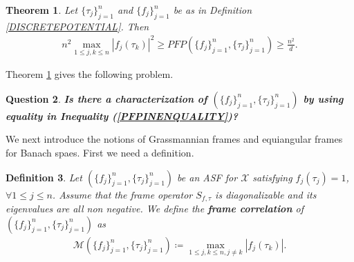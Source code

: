 \documentclass{amsart}
\newtheorem{theorem}{Theorem}[section]
\newtheorem{definition}[theorem]{Definition}
\newtheorem{question}[theorem]{Question}
\begin{document}
\begin{theorem}\label{PFPTHEOREM}
	Let $\{\tau_j\}_{j=1}^n$ and $\{f_j\}_{j=1}^n$ be as in Definition \ref{DISCRETEPOTENTIAL}. Then 	
	\begin{align}\label{PFPINENQUALITY}
n^2\max _{1\leq j,k \leq n}|f_j(\tau_k)|^2\geq 	PFP (\{f_j \}_{j=1}^n, \{\tau_j \}_{j=1}^n)	\geq \frac{n^2}{{d}}.	
	\end{align}
\end{theorem}
Theorem \ref{PFPTHEOREM}  gives the following problem.
 \begin{question}
	\textbf{Is  there  a characterization of $ (\{f_j \}_{j=1}^n, \{\tau_j \}_{j=1}^n) $ by using equality in Inequality (\ref{PFPINENQUALITY})?}
\end{question}
 We next introduce the notions of Grassmannian frames and equiangular frames for Banach spaes. First we need a definition.
  \begin{definition}
  	Let  $ (\{f_j \}_{j=1}^n, \{\tau_j \}_{j=1}^n) $ be an ASF  for $\mathcal{X}$ satisfying $f_j(\tau_j)=1$, $\forall 1\leq j \leq n$. 	Assume that  the  frame operator 
  	$	S_{f, \tau}$  is diagonalizable and its eigenvalues are all non negative. We define the  \textbf{frame correlation} of $ (\{f_j \}_{j=1}^n, \{\tau_j \}_{j=1}^n) $ as 
  	\begin{align*}
  		\mathcal{M}(\{f_j \}_{j=1}^n, \{\tau_j \}_{j=1}^n)\coloneqq \max _{1\leq j,k \leq n, j\neq k}|f_j(\tau_k)|.
  	\end{align*}
  \end{definition}
 
\end{document}
